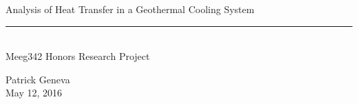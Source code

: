 \vspace*{20mm}
%
\Huge
\begin{center}
Analysis of Heat Transfer in a Geothermal Cooling System \\
\textcolor[RGB]{220,220,220}{\rule{\linewidth}{0.2pt}} \\
Meeg342 Honors Research Project
\end{center}
\normalsize
%
\vspace{10mm}
\begin{center}
Patrick Geneva \\
May 12, 2016
\end{center}
%
\vspace{10mm}

\setcounter{figure}{0}
\newpage